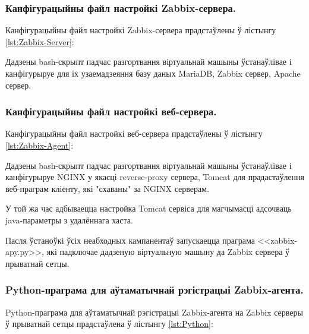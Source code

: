 \subsubsection{Канфігурацыйны файл настройкі Zabbix-сервера.}
Канфігурацыйны файл настройкі Zabbix-сервера прадстаўлены ў лістынгу
\ref{lst:Zabbix-Server}:



Дадзены bash-скрыпт падчас разгортвання віртуальнай машыны
ўстанаўлівае і канфігурыруе для іх узаемадзеяння
базу даных MariaDB, Zabbix сервер, Apache сервер.

\subsubsection{Канфігурацыйны файл настройкі веб-сервера.}
Канфігурацыйны файл настройкі веб-сервера прадстаўлены ў лістынгу
\ref{lst:Zabbix-Agent}:



Дадзены bash-скрыпт падчас разгортвання віртуальнай машыны
ўстанаўлівае і канфігурыруе NGINX у якасці reverse-proxy сервера,
Tomcat для прадастаўлення веб-праграм кліенту, які "схаваны" за NGINX серверам.

У той жа час адбываецца настройка Tomcat сервіса для магчымасці адсочваць
java-параметры з удалённага хаста.

Пасля ўстаноўкі ўсіх неабходных кампанентаў запускаецца праграма 
<<zabbix-apy.py>>, які падключае дадзеную віртуальную машыну да
Zabbix сервера ў прыватнай сетцы.

\subsubsection{Python-праграма для аўтаматычнай рэгістрацыі Zabbix-агента.}
Python-праграма для аўтаматычнай рэгістрацыі Zabbix-агента на Zabbix серверы ў
прыватнай сетцы прадстаўлена ў лістынгу
\ref{lst:Python}:



